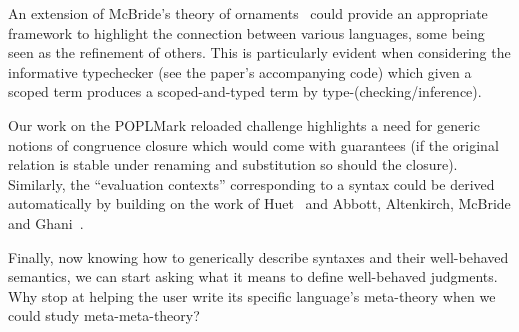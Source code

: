 An extension of McBride's theory of ornaments~\citeyear{mcbride2010ornamental}
could provide an appropriate framework to highlight the connection between various
languages, some being seen as the refinement of others. This is particularly
evident when considering the informative typechecker (see the paper's accompanying
code) which given a scoped term produces a scoped-and-typed term by
type-(checking/inference).

Our work on the POPLMark reloaded challenge highlights a need for generic
notions of congruence closure which would come with guarantees (if the original
relation is stable under renaming and substitution so should the closure).
Similarly, the ``evaluation contexts'' corresponding to a syntax could be
derived automatically by building on the work of Huet~\citeyear{huet_1997}
and Abbott, Altenkirch, McBride and Ghani~\citeyear{abbott2005data}.

Finally, now knowing how to generically describe syntaxes and their
well-behaved semantics, we can start asking what it means to define
well-behaved judgments. Why stop at helping the user write its specific
language's meta-theory when we could study meta-meta-theory?


\newpage
